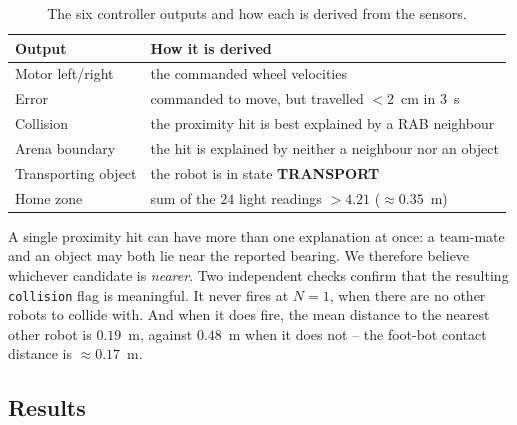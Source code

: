 \documentclass[12pt, a4paper]{article}
\begin{document}
\begin{table}[h]
\centering
\begin{tabular}{ll}
\toprule
\textbf{Output} & \textbf{How it is derived} \\
\midrule
Motor left/right     & the commanded wheel velocities \\
Error                & commanded to move, but travelled $< 2$~cm in $3$~s \\
Collision            & the proximity hit is best explained by a RAB neighbour \\
Arena boundary       & the hit is explained by neither a neighbour nor an object \\
Transporting object  & the robot is in state \textbf{TRANSPORT} \\
Home zone            & sum of the $24$ light readings $> 4.21$ ($\approx 0.35$~m) \\
\bottomrule
\end{tabular}
\caption{The six controller outputs and how each is derived from the sensors.}
\label{tab:outputs}
\end{table}

A single proximity hit can have more than one explanation at once: a team-mate
and an object may both lie near the reported bearing.  We therefore believe
whichever candidate is \emph{nearer}.  Two independent checks confirm that the
resulting \texttt{collision} flag is meaningful.  It never fires at $N = 1$,
when there are no other robots to collide with.  And when it does fire, the mean
distance to the nearest other robot is $0.19$~m, against $0.48$~m when it does
not -- the foot-bot contact distance is ${\approx}0.17$~m.

\subsection{Results}
\end{document}
